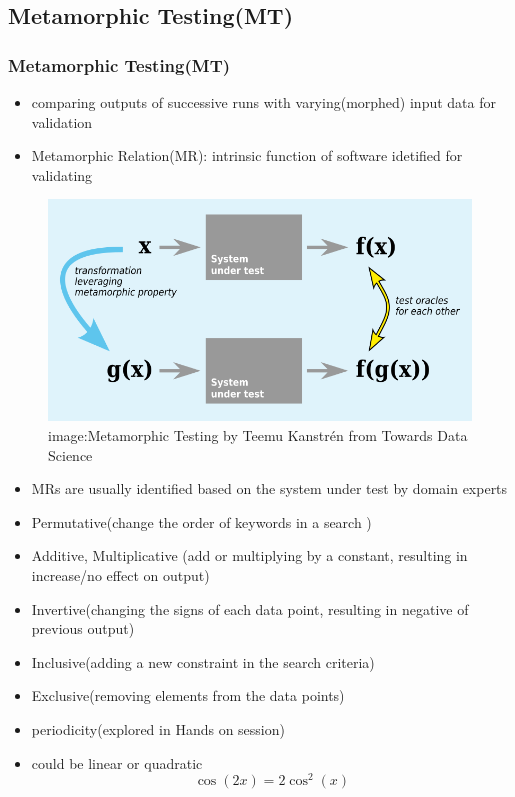 \subsection{Metamorphic Testing(MT)}

\begin{frame}[fragile]
	\frametitle{Metamorphic Testing(MT)}
	\begin{itemize}
		\item comparing outputs of successive runs with varying(morphed) input data for validation
		\item Metamorphic Relation(MR): intrinsic function of software idetified for validating
	\end{itemize}	

			\begin{figure}
				 \includegraphics[scale = 0.30]{images/Metamorphic_Testing_image}
				\linebreak
			 	\tiny{image:Metamorphic Testing by Teemu Kanstrén from Towards Data Science}
			\end{figure}
		
	
\end{frame}



\begin{frame}[fragile]
		\begin{itemize}
			
			\item MRs are usually identified based on the system under test by domain experts
			\item Permutative(change the order of keywords in a search )
			\item Additive, Multiplicative (add or multiplying by a constant, resulting in increase/no effect on output)
			\item Invertive(changing the signs of each data point, resulting in negative of previous output)
			\item Inclusive(adding a new constraint in the search criteria)
			\item Exclusive(removing elements from the data points)
			\item periodicity(explored in Hands on session)
			\item could be linear or quadratic $$ \cos{(2x)} = 2{\cos} ^2  (x)   $$
		\end{itemize}		
	
\end{frame}